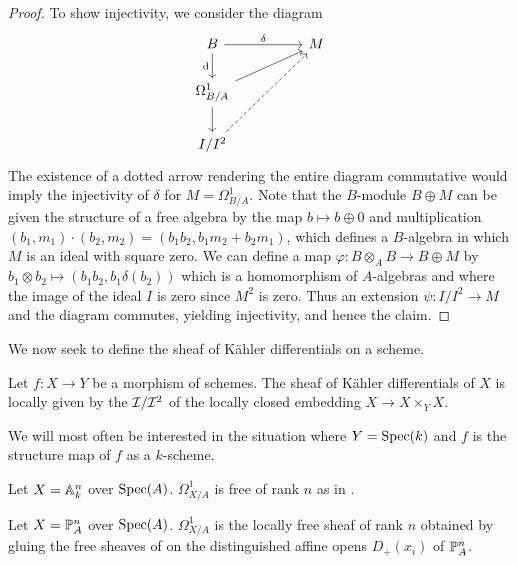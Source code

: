 \begin{proof}
    To show injectivity, we consider the diagram 
    $$%
    \begin{tikzcd}
        B && M \\
        {\Omega^{1}_{B/A}} \\
        {I/I^{2}}
        \arrow["\delta", from=1-1, to=1-3]
        \arrow["\dform"', from=1-1, to=2-1]
        \arrow[from=2-1, to=1-3]
        \arrow[from=2-1, to=3-1]
        \arrow[dashed, from=3-1, to=1-3]
    \end{tikzcd}$$
    The existence of a dotted arrow rendering the entire diagram commutative would imply the injectivity of $\delta$ for $M=\Omega^{1}_{B/A}$. Note that the $B$-module $B\oplus M$ can be given the structure of a free algebra by the map $b\mapsto b\oplus0$ and multiplication $(b_{1},m_{1})\cdot(b_{2},m_{2})=(b_{1}b_{2},b_{1}m_{2}+b_{2}m_{1})$, which defines a $B$-algebra in which $M$ is an ideal with square zero. We can define a map $\varphi:B\otimes_{A}B\to B\oplus M$ by $b_{1}\otimes b_{2}\mapsto (b_{1}b_{2},b_{1}\delta(b_{2}))$ which is a homomorphism of $A$-algebras and where the image of the ideal $I$ is zero since $M^{2}$ is zero. Thus an extension $\psi:I/I^{2}\to M$ and the diagram commutes, yielding injectivity, and hence the claim. 
\end{proof}
We now seek to define the sheaf of K\"{a}hler differentials on a scheme. 
\begin{definition}\label{def: kahler differentials of a scheme}
    Let $f:X\to Y$ be a morphism of schemes. The sheaf of K\"{a}hler differentials of $X$ is locally given by the $\mathcal{I}/\mathcal{I}^{2}$ of the locally closed embedding $X\to X\times_{Y}X$. 
\end{definition}
We will most often be interested in the situation where $Y=\operatorname{Spec}(k)$ and $f$ is the structure map of $f$ as a $k$-scheme. 
\begin{example}\label{ex: affine space scheme differentials}
    Let $X=\mathbb{A}^{n}_{k}$ over $\operatorname{Spec}(A)$. $\Omega^{1}_{X/A}$ is free of rank $n$ as in . 
\end{example}
\begin{example}
    Let $X=\mathbb{P}^{n}_{A}$ over $\operatorname{Spec}(A)$. $\Omega^{1}_{X/A}$ is the locally free sheaf of rank $n$ obtained by gluing the free sheaves of  on the distinguished affine opens $D_{+}(x_{i})$ of $\mathbb{P}^{n}_{A}$.  
\end{example}
